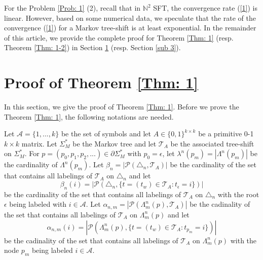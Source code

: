 \documentclass{amsart}
\theoremstyle{definition}
\begin{document}
For the Problem \ref{Prob: 1} (2), recall that in $\mathbb{N}^{2}$ SFT, the convergence rate (\ref{1}) is linear. However, based on some numerical data, we speculate that the rate of the convergence (\ref{1}) for a Markov tree-shift is at least exponential. In the remainder of this article, we provide the complete proof for Theorem \ref{Thm: 1} (resp. Theorem \ref{Thm: 1-2}) in Section \ref{sub 2} (resp. Section \ref{sub 3}).

\section{Proof of Theorem \ref{Thm: 1}}\label{sub 2}
In this section, we give the proof of Theorem \ref{Thm: 1}. Before we prove the Theorem \ref{Thm: 1}, the following notations are needed.

Let $\mathcal{A}=\{1,...,k\}$ be the set of symbols and let $A\in \{0,1\}^{k\times k}$ be a primitive 0-1 $k\times k$ matrix. Let $\Sigma_M^*$ be the Markov tree and let $\mathcal{T}_A$ be the associated tree-shift on $\Sigma_M^*$. For $p=(p_0,p_1,p_2,...)\in\partial\Sigma^*_M$ with $p_0=\epsilon$, let $\lambda^n(p_m)=|\Lambda^n(p_m)|$ be the cardinality of $\Lambda^n(p_m)$. Let $\beta_n=|\mathcal{P}(\triangle_n,\mathcal{T}_A)|$ be the cardinality of the set that contains all labelings of $\mathcal{T}_A$ on $\triangle_n$ and let 
\[\beta_n(i)=\lvert\mathcal{P}(\triangle_n,\{t=(t_w)\in\mathcal{T}_A:t_\epsilon=i\})\rvert\] 
be the cardinality of the set that contains all labelings of $\mathcal{T}_A$ on $\triangle_n$ with the root $\epsilon$ being labeled with $i\in \mathcal{A}$. Let $\alpha_{n,m}=|\mathcal{P}(\Lambda_m^n(p),\mathcal{T}_A)|$ be the cadinality of the set that contains all labelings of $\mathcal{T}_A$ on $\Lambda_m^n(p)$ and let 
\[\alpha_{n,m}(i)=|\mathcal{P}(\Lambda_m^n(p),\{t=(t_w)\in\mathcal{T}_A:t_{p_m}=i\})|\] be the cadinality of the set that contains all labelings of $\mathcal{T}_A$ on $\Lambda_m^n(p)$ with the node $p_m$ being labeled $i\in\mathcal{A}$.
\end{document}
